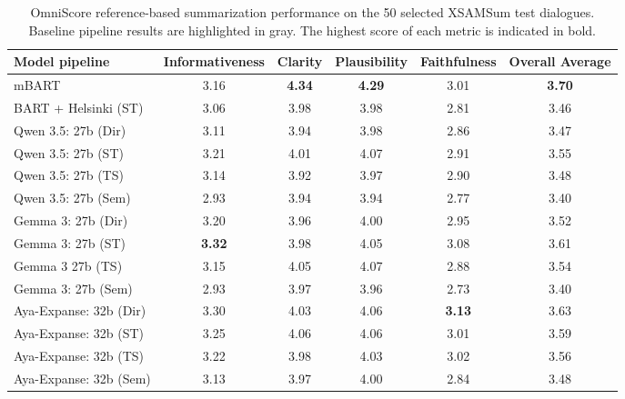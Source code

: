 \documentclass[11pt]{article}
\begin{document}
\begin{table}[ht]
\centering
\small
\begin{tabular}{lccccc}
\hline
\textbf{Model pipeline} & \textbf{Informativeness} & \textbf{Clarity} & \textbf{Plausibility} & \textbf{Faithfulness} & \textbf{Overall Average}\\ \hline

\rowcolor{gray!15}mBART                  & 3.16          & \textbf{4.34} & \textbf{4.29} & 3.01          & \textbf{3.70} \\
\rowcolor{gray!15}BART + Helsinki (ST)   & 3.06          & 3.98          & 3.98          & 2.81          & 3.46          \\
\hline
Qwen 3.5: 27b (Dir)    & 3.11          & 3.94          & 3.98          & 2.86          & 3.47          \\
Qwen 3.5: 27b (ST)     & 3.21          & 4.01          & 4.07          & 2.91          & 3.55          \\
Qwen 3.5: 27b (TS)     & 3.14          & 3.92          & 3.97          & 2.90          & 3.48          \\
Qwen 3.5: 27b (Sem)    & 2.93          & 3.94          & 3.94          & 2.77          & 3.40          \\
\hline
Gemma 3: 27b (Dir)     & 3.20          & 3.96          & 4.00          & 2.95          & 3.52          \\
Gemma 3: 27b (ST)      & \textbf{3.32} & 3.98          & 4.05          & 3.08          & 3.61          \\
Gemma 3 27b (TS)       & 3.15          & 4.05          & 4.07          & 2.88          & 3.54          \\
Gemma 3: 27b (Sem)     & 2.93          & 3.97          & 3.96          & 2.73          & 3.40          \\
\hline
Aya-Expanse: 32b (Dir) & 3.30          & 4.03          & 4.06          & \textbf{3.13} & 3.63          \\
Aya-Expanse: 32b (ST)  & 3.25          & 4.06          & 4.06          & 3.01          & 3.59          \\
Aya-Expanse: 32b (TS)  & 3.22          & 3.98          & 4.03          & 3.02          & 3.56          \\
Aya-Expanse: 32b (Sem) & 3.13          & 3.97          & 4.00          & 2.84          & 3.48 \\
\hline
\end{tabular}
\caption{OmniScore reference-based summarization performance on the 50 selected XSAMSum test dialogues. Baseline pipeline results are highlighted in gray. The highest score of each metric is indicated in bold.}
\label{tab:omniscore_reference_based}
\end{table}
\end{document}
